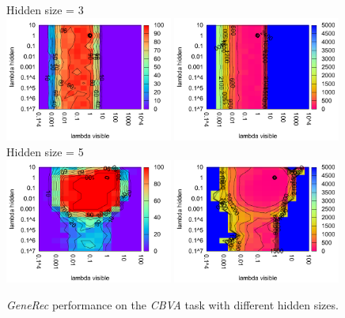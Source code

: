 \begin{figure}[H]
  \centering
  Hidden size = 3 \\
  \includegraphics[width=0.49\textwidth]{img/k3/generec-3-success.pdf} 
  \includegraphics[width=0.49\textwidth]{img/k3/generec-3-epoch.pdf}   
  Hidden size = 5 \\
  \includegraphics[width=0.49\textwidth]{img/k3/generec-5-success.pdf} 
  \includegraphics[width=0.49\textwidth]{img/k3/generec-5-epoch.pdf}  
  \caption{\emph{GeneRec} performance on the \emph{CBVA} task with different hidden sizes.} %
  \label{fig:results-generec-k3-success}
\end{figure}

